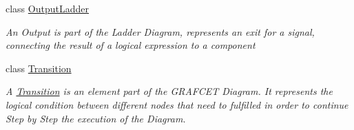 \begin{DoxyCompactItemize}
class \hyperlink{class_prototipo_t_f_g_1_1_output_ladder}{Output\+Ladder}
\begin{DoxyCompactList}\small\item\em An Output is part of the Ladder Diagram, represents an exit for a signal, connecting the result of a logical expression to a component \end{DoxyCompactList}\item 
class \hyperlink{class_prototipo_t_f_g_1_1_transition}{Transition}
\begin{DoxyCompactList}\small\item\em A \hyperlink{class_prototipo_t_f_g_1_1_transition}{Transition} is an element part of the G\+R\+A\+F\+C\+E\+T Diagram. It represents the logical condition between different nodes that need to fulfilled in order to continue Step by Step the execution of the Diagram. \end{DoxyCompactList}\end{DoxyCompactItemize}
